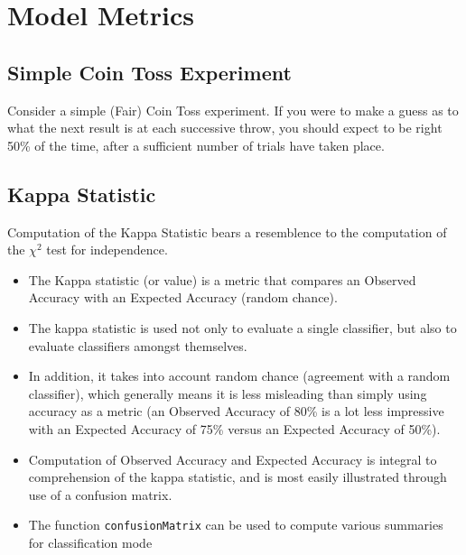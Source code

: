\documentclass[caret-main.tex]{subfiles}
\begin{document}
\section{Model Metrics}


\subsection{Simple Coin Toss Experiment}

Consider a simple (Fair) Coin Toss experiment. If you were to make a guess as to what the next result is  at each successive throw, you should expect to be right 50\% of the time, after a sufficient number of trials have taken place.

\subsection{Kappa Statistic}

Computation of the Kappa Statistic bears a resemblence to the computation of the $\chi^2$ test for independence.
\begin{itemize}
\item The Kappa statistic (or value) is a metric that compares an Observed Accuracy with an Expected Accuracy (random chance).\item The kappa statistic is used not only to evaluate a single classifier, but also to evaluate classifiers amongst themselves. \item In addition, it takes into account random chance (agreement with a random classifier), which generally means it is less misleading than simply using accuracy as a metric (an Observed Accuracy of 80\% is a lot less impressive with an Expected Accuracy of 75\% versus an Expected Accuracy of 50\%). \item Computation of Observed Accuracy and Expected Accuracy is integral to comprehension of the kappa statistic, and is most easily illustrated through use of a confusion matrix.
\item 
The function \texttt{confusionMatrix} can be used to compute various summaries for classification
mode
\end{itemize}
\newpage
\end{document}
